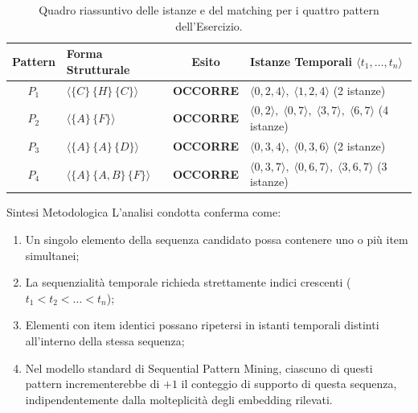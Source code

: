 \begin{table}[H]
\centering
\small
\renewcommand{\arraystretch}{1.25}
\begin{tabularx}{\textwidth}{c Y c Y}
\toprule
\textbf{Pattern} & \textbf{Forma Strutturale} & \textbf{Esito} & \textbf{Istanze Temporali $\langle t_1, \dots, t_n \rangle$} \\
\midrule
$P_1$ & $\langle \{C\} \, \{H\} \, \{C\} \rangle$ & \textbf{OCCORRE} & $\langle 0, 2, 4 \rangle, \; \langle 1, 2, 4 \rangle$ (2 istanze) \\
$P_2$ & $\langle \{A\} \, \{F\} \rangle$ & \textbf{OCCORRE} & $\langle 0, 2 \rangle, \; \langle 0, 7 \rangle, \; \langle 3, 7 \rangle, \; \langle 6, 7 \rangle$ (4 istanze) \\
$P_3$ & $\langle \{A\} \, \{A\} \, \{D\} \rangle$ & \textbf{OCCORRE} & $\langle 0, 3, 4 \rangle, \; \langle 0, 3, 6 \rangle$ (2 istanze) \\
$P_4$ & $\langle \{A\} \, \{A, B\} \, \{F\} \rangle$ & \textbf{OCCORRE} & $\langle 0, 3, 7 \rangle, \; \langle 0, 6, 7 \rangle, \; \langle 3, 6, 7 \rangle$ (3 istanze) \\
\bottomrule
\end{tabularx}
\caption{Quadro riassuntivo delle istanze e del matching per i quattro pattern dell'Esercizio.}
\label{tab:dm-seq-exercise-summary}
\end{table}

\begin{noteblock}{Sintesi Metodologica}
    L'analisi condotta conferma come:
    \begin{enumerate}[noitemsep]
        \item Un singolo elemento della sequenza candidato possa contenere uno o più item simultanei;
        \item La sequenzialità temporale richieda strettamente indici crescenti ($t_1 < t_2 < \dots < t_n$);
        \item Elementi con item identici possano ripetersi in istanti temporali distinti all'interno della stessa sequenza;
        \item Nel modello standard di Sequential Pattern Mining, ciascuno di questi pattern incrementerebbe di $+1$ il conteggio di supporto di questa sequenza, indipendentemente dalla molteplicità degli embedding rilevati.
    \end{enumerate}
\end{noteblock}
